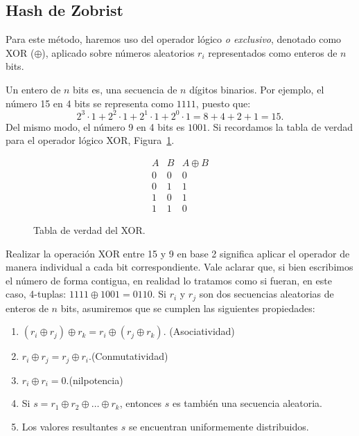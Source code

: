 \subsection{Hash de Zobrist}\label{ZobristHash}

Para este método, haremos uso del operador lógico \textit{o exclusivo}, denotado como XOR ($\oplus$), aplicado sobre números aleatorios $r_i$ representados como enteros de $n$ bits.

Un entero de $n$ bits es, una secuencia de $n$ dígitos binarios. Por ejemplo, el número 15 en 4 bits se representa como $1111$, puesto que:
\[ 2^3 \cdot 1 + 2^2 \cdot 1 + 2^1 \cdot 1 + 2^0 \cdot 1 = 8 + 4 + 2 + 1 = 15. \]
Del mismo modo, el número 9 en 4 bits es $1001$. Si recordamos la tabla de verdad para el operador lógico XOR, Figura~\ref{TablaXOR}.
\vspace{10pt}

\begin{figure}
	\vspace{-20pt}
	\centering
	\[
	\begin{array}{c|c|c}
		A & B & A \oplus B \\
		\hline
		0 & 0 & 0 \\
		0 & 1 & 1 \\
		1 & 0 & 1 \\
		1 & 1 & 0
	\end{array}
	\]
	\caption{Tabla de verdad del XOR.}
	\label{TablaXOR}
\end{figure}Realizar la operación XOR entre 15 y 9 en base 2 significa aplicar el operador de manera individual a cada bit correspondiente. Vale aclarar que, si bien escribimos el número de forma contigua, en realidad lo tratamos como si fueran, en este caso, 4-tuplas: $1111 \oplus 1001 = 0110$. Si $r_i$ y $r_j$ son dos secuencias aleatorias de enteros de $n$ bits, asumiremos que se cumplen las siguientes propiedades:\hfill\break

\begin{enumerate}
	\item[P1)] $( r_i \oplus r_j ) \oplus r_k = r_i \oplus ( r_j \oplus r_k )$. \hfill(Asociatividad)
	\item[P2)] $r_i \oplus r_j = r_j \oplus r_i$.\hfill (Conmutatividad)
	\item[P3)] $r_i \oplus r_i = 0$.\hfill (nilpotencia)
	\item[P4)] Si $s = r_1 \oplus r_2 \oplus \dots \oplus r_k$, entonces $s$ es también una secuencia aleatoria.
	\item[P5)] Los valores resultantes $s$ se encuentran uniformemente distribuidos.
\end{enumerate}

